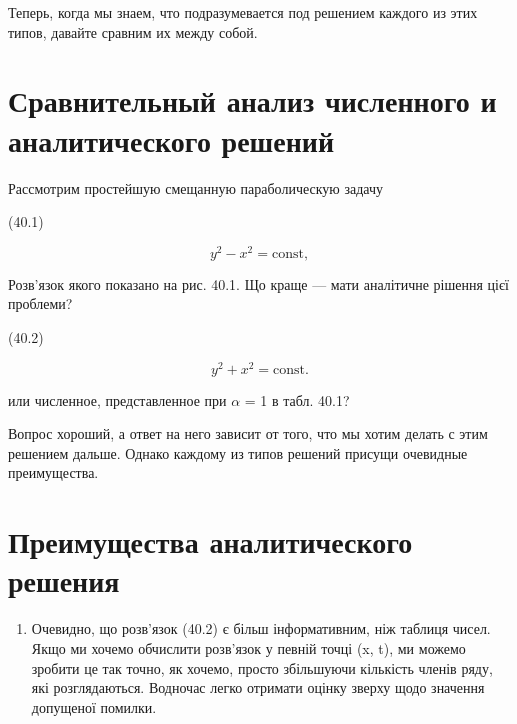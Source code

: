 \documentclass[
  ukrainian,
]{article}
\providecommand{\tightlist}{%
  \setlength{\itemsep}{0pt}\setlength{\parskip}{0pt}}
\begin{document}
Теперь, когда мы знаем, что подразумевается под решением каждого из этих
типов, давайте сравним их между собой.

\section{\texorpdfstring{\textbf{Сравнительный анализ численного} и
аналитического
решений}{Сравнительный анализ численного и аналитического решений}}\label{ux441ux440ux430ux432ux43dux438ux442ux435ux43bux44cux43dux44bux439-ux430ux43dux430ux43bux438ux437-ux447ux438ux441ux43bux435ux43dux43dux43eux433ux43e-ux438-ux430ux43dux430ux43bux438ux442ux438ux447ux435ux441ux43aux43eux433ux43e-ux440ux435ux448ux435ux43dux438ux439}

Рассмотрим простейшую смещанную параболическую задачу

(40.1)

\[
y^2 - x^2 = \text{const},
\]

Розв'язок якого показано на рис. 40.1. Що краще --- мати аналітичне
рішення цієї проблеми?

(40.2)

\[
y^2 + x^2 = \text{const}.
\]

или численное, представленное при \(\alpha\) = 1 в табл. 40.1?

Вопрос хороший, а ответ на него зависит от того, что мы хотим делать с
этим решением дальше. Однако каждому из типов решений присущи очевидные
преимущества.

\section{Преимущества аналитического
решения}\label{ux43fux440ux435ux438ux43cux443ux449ux435ux441ux442ux432ux430-ux430ux43dux430ux43bux438ux442ux438ux447ux435ux441ux43aux43eux433ux43e-ux440ux435ux448ux435ux43dux438ux44f}

\begin{enumerate}
\def\labelenumi{\arabic{enumi}.}
\tightlist
\item
  Очевидно, що розв'язок (40.2) є більш інформативним, ніж таблиця
  чисел. Якщо ми хочемо обчислити розв'язок у певній точці (x, t), ми
  можемо зробити це так точно, як хочемо, просто збільшуючи кількість
  членів ряду, які розглядаються. Водночас легко отримати оцінку зверху
  щодо значення допущеної помилки.
\end{enumerate}
\end{document}
